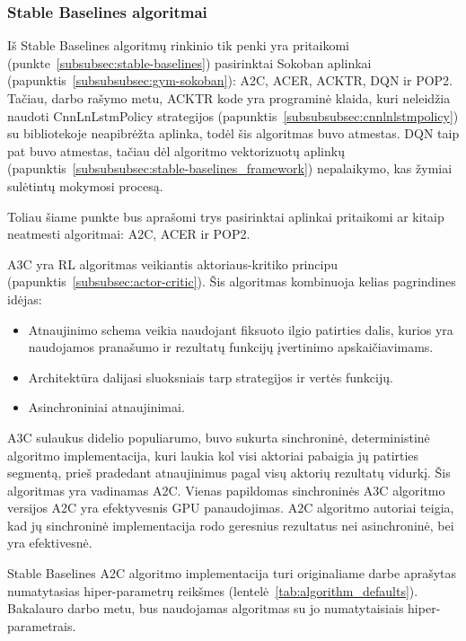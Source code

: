 \documentclass{VUMIFPSbakalaurinis}
\begin{document}
\subsubsection{Stable Baselines algoritmai}
{
	Iš Stable Baselines algoritmų rinkinio tik penki yra pritaikomi (punkte~\ref{subsubsec:stable-baselines}) pasirinktai Sokoban aplinkai (papunktis~\ref{subsubsubsec:gym-sokoban}): A2C, ACER, ACKTR, DQN ir POP2. Tačiau, darbo rašymo metu, ACKTR kode yra programinė klaida, kuri  neleidžia naudoti CnnLnLstmPolicy strategijos (papunktis~\ref{subsubsubsec:cnnlnlstmpolicy}) su bibliotekoje neapibrėžta aplinka, todėl šis algoritmas buvo atmestas. DQN taip pat buvo atmestas, tačiau dėl algoritmo vektorizuotų aplinkų (papunktis~\ref{subsubsubsec:stable-baselines_framework}) nepalaikymo, kas žymiai sulėtintų mokymosi procesą.\par
	
	Toliau šiame punkte bus aprašomi trys pasirinktai aplinkai pritaikomi ar kitaip neatmesti algoritmai: A2C, ACER ir POP2.
}
\label{subsubsubsec:a2c}
{
	A3C \cite{a3c} yra RL algoritmas veikiantis aktoriaus-kritiko principu (papunktis~\ref{subsubsec:actor-critic}). Šis algoritmas kombinuoja kelias pagrindines idėjas:
	\begin{itemize}
		\item Atnaujinimo schema veikia naudojant fiksuoto ilgio patirties dalis, kurios yra naudojamos pranašumo ir rezultatų funkcijų įvertinimo apskaičiavimams.
		
		\item Architektūra dalijasi sluoksniais tarp strategijos ir vertės funkcijų.
		
		\item Asinchroniniai atnaujinimai.
	\end{itemize}
	
	A3C sulaukus didelio populiarumo, buvo sukurta sinchroninė, deterministinė algoritmo implementacija, kuri laukia kol visi aktoriai pabaigia jų patirties segmentą, prieš pradedant atnaujinimus pagal visų aktorių rezultatų vidurkį. Šis algoritmas yra vadinamas A2C. Vienas papildomas sinchroninės A3C algoritmo versijos A2C yra efektyvesnis GPU panaudojimas. A2C algoritmo autoriai teigia, kad jų sinchroninė implementacija rodo geresnius rezultatus nei asinchroninė, bei yra efektivesnė\cite{wu_2019}.\par
	
	Stable Baselines A2C algoritmo implementacija turi originaliame darbe aprašytas numatytasias hiper-parametrų reikšmes (lentelė~\ref{tab:algorithm_defaults}). Bakalauro darbo metu, bus naudojamas algoritmas su jo numatytaisiais hiper-parametrais. 
}
\end{document}
